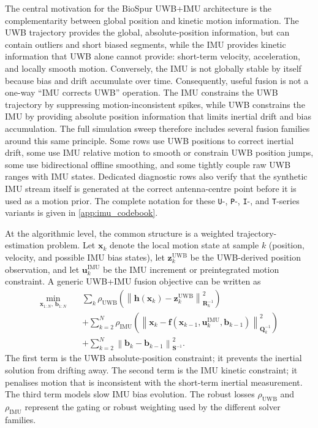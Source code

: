\documentclass[11pt,a4paper]{article}
\begin{document}
The central motivation for the BioSpur UWB+IMU architecture is the complementarity between global position and kinetic motion information.
The UWB trajectory provides the global, absolute-position information, but can contain outliers and short biased segments, while the IMU provides kinetic information that UWB alone cannot provide: short-term velocity, acceleration, and locally smooth motion.
Conversely, the IMU is not globally stable by itself because bias and drift accumulate over time.
Consequently, useful fusion is not a one-way ``IMU corrects UWB'' operation.
The IMU constrains the UWB trajectory by suppressing motion-inconsistent spikes, while UWB constrains the IMU by providing absolute position information that limits inertial drift and bias accumulation.
The full simulation sweep therefore includes several fusion families around this same principle.
Some rows use UWB positions to correct inertial drift, some use IMU relative motion to smooth or constrain UWB position jumps, some use bidirectional offline smoothing, and some tightly couple raw UWB ranges with IMU states.
Dedicated diagnostic rows also verify that the synthetic IMU stream itself is generated at the correct antenna-centre point before it is used as a motion prior.
The complete notation for these \texttt{U}-, \texttt{P}-, \texttt{I}-, and \texttt{T}-series variants is given in \cref{app:imu_codebook}.

At the algorithmic level, the common structure is a weighted trajectory-estimation problem.
Let $\mathbf{x}_k$ denote the local motion state at sample $k$ (position, velocity, and possible IMU bias states), let $\mathbf{z}^{\mathrm{UWB}}_k$ be the UWB-derived position observation, and let $\mathbf{u}^{\mathrm{IMU}}_k$ be the IMU increment or preintegrated motion constraint.
A generic UWB+IMU fusion objective can be written as
\begin{equation}
  \begin{aligned}
  \min_{\mathbf{x}_{1:N},\,\mathbf{b}_{1:N}}
  \quad
  &\sum_k
  \rho_{\mathrm{UWB}}
  \!\left(
    \left\lVert
      \mathbf{h}(\mathbf{x}_k) - \mathbf{z}^{\mathrm{UWB}}_k
    \right\rVert^2_{\mathbf{R}_k^{-1}}
  \right) \\
  &+
  \sum_{k=2}^{N}
  \rho_{\mathrm{IMU}}
  \!\left(
    \left\lVert
      \mathbf{x}_k -
      \mathbf{f}(\mathbf{x}_{k-1}, \mathbf{u}^{\mathrm{IMU}}_k, \mathbf{b}_{k-1})
    \right\rVert^2_{\mathbf{Q}_k^{-1}}
  \right) \\
  &+
  \sum_{k=2}^{N}
  \left\lVert \mathbf{b}_k - \mathbf{b}_{k-1} \right\rVert^2_{\mathbf{S}^{-1}} .
  \end{aligned}
\end{equation}
The first term is the UWB absolute-position constraint; it prevents the inertial solution from drifting away.
The second term is the IMU kinetic constraint; it penalises motion that is inconsistent with the short-term inertial measurement.
The third term models slow IMU bias evolution.
The robust losses $\rho_{\mathrm{UWB}}$ and $\rho_{\mathrm{IMU}}$ represent the gating or robust weighting used by the different solver families.
\end{document}

